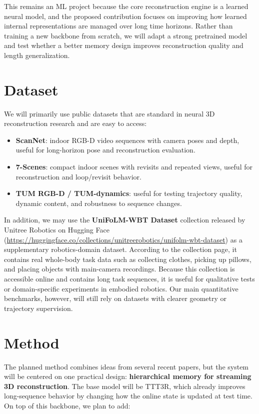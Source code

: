 \documentclass[10pt]{article}
\begin{document}
This remains an ML project because the core reconstruction engine is a learned neural model, and the proposed contribution focuses on improving how learned internal representations are managed over long time horizons. Rather than training a new backbone from scratch, we will adapt a strong pretrained model and test whether a better memory design improves reconstruction quality and length generalization.

\section*{Dataset}
We will primarily use public datasets that are standard in neural 3D reconstruction research and are easy to access:

\begin{itemize}[leftmargin=1.6em]
  \item \textbf{ScanNet}: indoor RGB-D video sequences with camera poses and depth, useful for long-horizon pose and reconstruction evaluation.
  \item \textbf{7-Scenes}: compact indoor scenes with revisits and repeated views, useful for reconstruction and loop/revisit behavior.
  \item \textbf{TUM RGB-D / TUM-dynamics}: useful for testing trajectory quality, dynamic content, and robustness to sequence changes.
\end{itemize}

In addition, we may use the \textbf{UniFoLM-WBT Dataset} collection released by Unitree Robotics on Hugging Face (\url{https://huggingface.co/collections/unitreerobotics/unifolm-wbt-dataset}) as a supplementary robotics-domain dataset. According to the collection page, it contains real whole-body task data such as collecting clothes, picking up pillows, and placing objects with main-camera recordings. Because this collection is accessible online and contains long task sequences, it is useful for qualitative tests or domain-specific experiments in embodied robotics. Our main quantitative benchmarks, however, will still rely on datasets with clearer geometry or trajectory supervision.

\section*{Method}
The planned method combines ideas from several recent papers, but the system will be centered on one practical design: \textbf{hierarchical memory for streaming 3D reconstruction}. The base model will be TTT3R, which already improves long-sequence behavior by changing how the online state is updated at test time. On top of this backbone, we plan to add:
\end{document}
